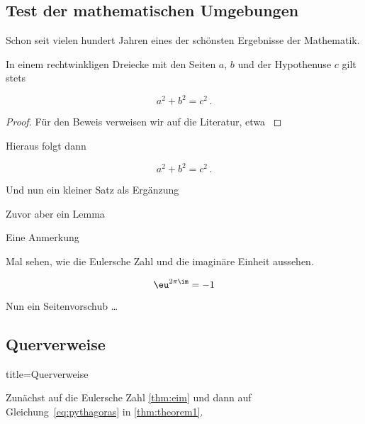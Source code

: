\subsection{Test der mathematischen Umgebungen}\label{subsec:mumgebungen}
Schon seit vielen hundert Jahren eines der schönsten Ergebnisse der Mathematik.
%
\begin{theorem}\label{thm:theorem1}
In einem rechtwinkligen Dreiecke mit den Seiten $ a $, $ b $ und der Hypothenuse $ c $ gilt stets

\begin{equation}\label{eq:pythagoras}
	a^{ 2 } + b^{ 2 } = c^{ 2 } \, .
\end{equation}
\end{theorem}
%
\begin{proof}
Für den Beweis verweisen wir auf die Literatur, etwa \textcite{efhn:2016}
\end{proof}
\begin{corollary}\label{cor:folgerung}
Hieraus folgt dann 

\[
	a^{ 2 } + b^{ 2 } = c^{ 2 } \, .
\]
%


\end{corollary}
%
\begin{proposition}\label{prop:prop}
Und nun ein kleiner Satz als Ergänzung 
\end{proposition}
%
\begin{lemma}
Zuvor aber ein Lemma
\end{lemma}
%
\begin{remark}
Eine Anmerkung
\end{remark}
Mal sehen, wie die Eulersche Zahl und die imaginäre Einheit aussehen.
\begin{theorem}\label{thm:eim}
\begin{equation}\label{eq:pythagoras}
\eu^{ 2 \pi \im } = -1 
\end{equation}
\end{theorem}
Nun ein Seitenvorschub \ldots
%
\newpage
\subsection{Querverweise}\label{subsec:referenzen}

\begin{dispExample*}{title=Querverweise}
\end{dispExample*}
%
Zunächst auf die Eulersche Zahl \vref{thm:eim} und dann auf Gleichung~\eqref{eq:pythagoras} in \vref{thm:theorem1}.
%

